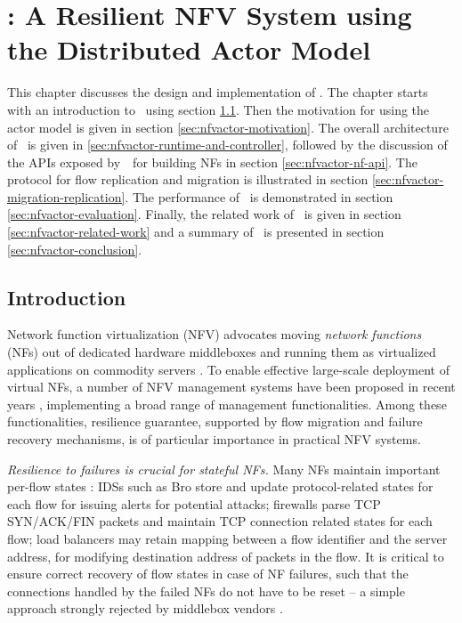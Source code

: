 \chapter {\nfactor: A Resilient NFV System using the Distributed Actor Model}
\label{ch:nfvactor}

This chapter discusses the design and implementation of \nfactor. The chapter starts with an introduction to \nfactor~using section \ref{sec:nfvactor-introduction}. Then the motivation for using the actor model is given in section \ref{sec:nfvactor-motivation}. The overall architecture of \nfactor~is given in \ref{sec:nfvactor-runtime-and-controller}, followed by the discussion of the APIs exposed by~\nfactor~for building NFs in section \ref{sec:nfvactor-nf-api}. The protocol for flow replication and migration is illustrated in section \ref{sec:nfvactor-migration-replication}. The performance of \nfactor~is demonstrated in section \ref{sec:nfvactor-evaluation}. Finally, the related work of \nfactor~is given in section \ref{sec:nfvactor-related-work} and a summary of \nfactor~is presented in section \ref{sec:nfvactor-conclusion}.

\section{Introduction}
\label{sec:nfvactor-introduction}

Network function virtualization (NFV) advocates moving
{\em network functions} (NFs) out of dedicated hardware middleboxes and running them as virtualized applications on commodity servers \cite{nfv-white-paper}. To enable effective large-scale deployment of virtual NFs, a number of NFV management systems have been proposed in recent years \cite{palkar2015e2, OpenBox, sekar2012design, anderson2012xomb, gember2012stratos, zhang2016opennetvm}, implementing a broad range of management functionalities. Among these functionalities, resilience guarantee, supported by flow migration and failure recovery mechanisms, is of particular importance in practical NFV systems.


{\em Resilience to failures \cite{sherry2015rollback,rajagopalan2013pico} is crucial for stateful NFs.}  Many NFs maintain important per-flow states \cite{EnablingNF}: IDSs such as Bro \cite{bro} store and update protocol-related states for each flow for issuing alerts for potential attacks; firewalls \cite{firewall} parse TCP SYN/ACK/FIN packets and maintain TCP connection related states for each flow; load balancers \cite{lvs} may retain mapping between a flow identifier and the server address, for modifying destination address of packets in the flow. It is critical to ensure correct recovery of flow states in case of NF failures, such that the connections handled by the failed NFs do not have to be reset -- a simple approach strongly rejected by middlebox vendors \cite{sherry2015rollback}.

